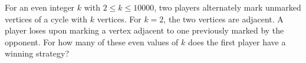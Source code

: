 For an even integer $k$ with $2\le k\le10000$, two players alternately mark unmarked vertices of a cycle with $k$ vertices. For $k=2$, the two vertices are adjacent. A player loses upon marking a vertex adjacent to one previously marked by the opponent. For how many of these even values of $k$ does the first player have a winning strategy?
